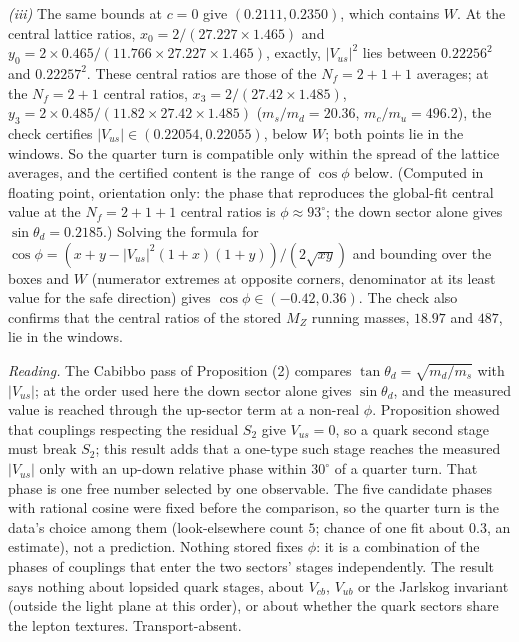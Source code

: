 \emph{(iii)} The same bounds at $c = 0$ give $(0.2111, 0.2350)$, which contains $W$. At the central lattice ratios, $x_{0} = 2/(27.227 \times 1.465)$ and $y_{0} = 2 \times 0.465/(11.766 \times 27.227 \times 1.465)$, exactly, $|V_{us}|^{2}$ lies between $0.22256^{2}$ and $0.22257^{2}$. These central ratios are those of the $N_{f} = 2+1+1$ averages; at the $N_{f} = 2+1$ central ratios, $x_{3} = 2/(27.42 \times 1.485)$, $y_{3} = 2 \times 0.485/(11.82 \times 27.42 \times 1.485)$ ($m_{s}/m_{d} = 20.36$, $m_{c}/m_{u} = 496.2$), the check certifies $|V_{us}| \in (0.22054, 0.22055)$, below $W$; both points lie in the windows. So the quarter turn is compatible only within the spread of the lattice averages, and the certified content is the range of $\cos\phi$ below. (Computed in floating point, orientation only: the phase that reproduces the global-fit central value at the $N_{f} = 2+1+1$ central ratios is $\phi \approx 93^{\circ}$; the down sector alone gives $\sin\theta_{d} = 0.2185$.) Solving the formula for $\cos\phi = (x + y - |V_{us}|^{2}(1 + x)(1 + y))/(2\sqrt{xy})$ and bounding over the boxes and $W$ (numerator extremes at opposite corners, denominator at its least value for the safe direction) gives $\cos\phi \in (-0.42, 0.36)$. The check also confirms that the central ratios of the stored $M_{Z}$ running masses, $18.97$ and $487$, lie in the windows.

\emph{Reading.} The Cabibbo pass of Proposition (2) compares $\tan\theta_{d} = \sqrt{m_{d}/m_{s}}$ with $|V_{us}|$; at the order used here the down sector alone gives $\sin\theta_{d}$, and the measured value is reached through the up-sector term at a non-real $\phi$. Proposition  showed that couplings respecting the residual $S_{2}$ give $V_{us} = 0$, so a quark second stage must break $S_{2}$; this result adds that a one-type such stage reaches the measured $|V_{us}|$ only with an up-down relative phase within $30^{\circ}$ of a quarter turn. That phase is one free number selected by one observable. The five candidate phases with rational cosine were fixed before the comparison, so the quarter turn is the data's choice among them (look-elsewhere count $5$; chance of one fit about $0.3$, an estimate), not a prediction. Nothing stored fixes $\phi$: it is a combination of the phases of couplings that enter the two sectors' stages independently. The result says nothing about lopsided quark stages, about $V_{cb}$, $V_{ub}$ or the Jarlskog invariant (outside the light plane at this order), or about whether the quark sectors share the lepton textures. Transport-absent.
